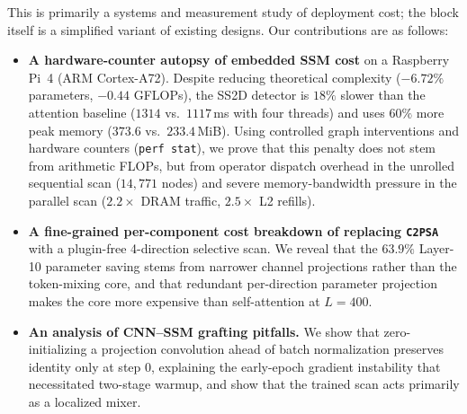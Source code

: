 This is primarily a systems and measurement study of deployment cost; the block itself is a simplified variant of existing designs. Our contributions are as follows:
\begin{itemize}
    \item \textbf{A hardware-counter autopsy of embedded SSM cost} on a Raspberry Pi~4 (ARM Cortex-A72). Despite reducing theoretical complexity ($-6.72\%$ parameters, $-0.44$ GFLOPs), the SS2D detector is $18\%$ slower than the attention baseline ($1314$ vs.\ $1117$\,ms with four threads) and uses $60\%$ more peak memory ($373.6$ vs.\ $233.4$\,MiB). Using controlled graph interventions and hardware counters (\texttt{perf stat}), we prove that this penalty does not stem from arithmetic FLOPs, but from operator dispatch overhead in the unrolled sequential scan ($14{,}771$ nodes) and severe memory-bandwidth pressure in the parallel scan ($2.2\times$ DRAM traffic, $2.5\times$ L2 refills).
    \item \textbf{A fine-grained per-component cost breakdown of replacing \texttt{C2PSA}} with a plugin-free 4-direction selective scan. We reveal that the $63.9\%$ Layer-10 parameter saving stems from narrower channel projections rather than the token-mixing core, and that redundant per-direction parameter projection makes the core more expensive than self-attention at $L = 400$.
    \item \textbf{An analysis of CNN--SSM grafting pitfalls.} We show that zero-initializing a projection convolution ahead of batch normalization preserves identity only at step 0, explaining the early-epoch gradient instability that necessitated two-stage warmup, and show that the trained scan acts primarily as a localized mixer.
\end{itemize}
